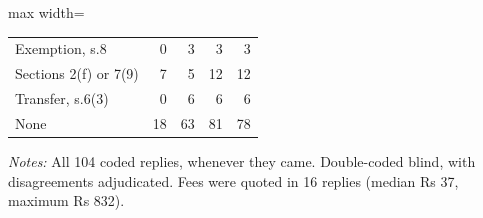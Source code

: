 \begin{table}[!htbp]
\begin{adjustbox}{max width=\textwidth}
\begin{threeparttable}
\begin{tabular}{lrrrr}
\quad Exemption, s.8 & 0 & 3 & 3 & 3 \\
\quad Sections 2(f) or 7(9) & 7 & 5 & 12 & 12 \\
\quad Transfer, s.6(3) & 0 & 6 & 6 & 6 \\
\quad None & 18 & 63 & 81 & 78 \\
\bottomrule
\end{tabular}
\begin{tablenotes}[flushleft]\footnotesize
\item \textit{Notes:} All 104 coded replies, whenever they came. Double-coded blind, with disagreements adjudicated. Fees were quoted in 16 replies (median Rs 37, maximum Rs 832).
\end{tablenotes}
\end{threeparttable}
\end{adjustbox}
\end{table}
